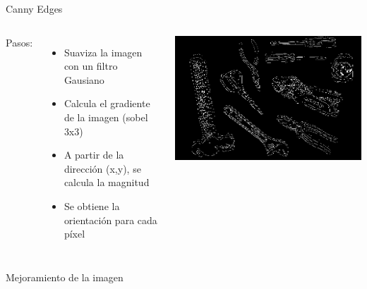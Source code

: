 \documentclass[
  24pt, %
]{beamer}
\begin{document}
\begin{frame}{Canny Edges}
  \begin{columns}
    Pasos:
    \begin{itemize}
    \item Suaviza la imagen con un filtro Gausiano
    \item Calcula el gradiente de la imagen (sobel 3x3)
    \item A partir de la dirección (x,y), se calcula la magnitud
    \item Se obtiene la orientación para cada píxel
    \end{itemize}
    \includegraphics[width=\textwidth]{canny}
  \end{columns}
\end{frame}

\begin{frame}{Mejoramiento de la imagen}

  \centering
    
\end{frame}
\end{document}
